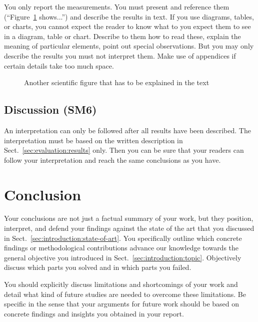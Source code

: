 \documentclass[12pt,a4paper,footinclude=true,twoside,headinclude=true]{report}
\begin{document}
You only report the measurements. You must present and reference them (``Figure~\ref{fig:my_label2} shows...'') and describe the results in text. If you use diagrams, tables, or charts, you cannot expect the reader to know what to you expect them to see in a diagram, table or chart. Describe to them how to read these, explain the meaning of particular elements, point out special observations. But you may only describe the results you must not interpret them. Make use of appendices if certain details take too much space.

\begin{figure}
    \centering
    \caption{Another scientific figure that has to be explained in the text}
    \label{fig:my_label2}
\end{figure}

\section{Discussion (SM6)}\label{sec:evaluation:discussion}

An interpretation can only be followed after all results have been described. The interpretation must be based on the written description in Sect.~\ref{sec:evaluation:results} only. Then you can be sure that your readers can follow your interpretation and reach the same conclusions as you have.

\chapter{Conclusion}\label{sec:conclusion}

Your conclusions are not just a factual summary of your work, but they position, interpret, and defend your findings against the state of the art that you discussed in Sect.~\ref{sec:introduction:state-of-art}. You specifically outline which concrete findings or methodological contributions advance our knowledge towards the general objective you introduced in Sect.~\ref{sec:introduction:topic}. Objectively discuss which parts you solved and in which parts you failed.

You should explicitly discuss limitations and shortcomings of your work and detail what kind of future studies are needed to overcome these limitations. Be specific in the sense that your arguments for future work should be based on concrete findings and insights you obtained in your report. 
\end{document}

